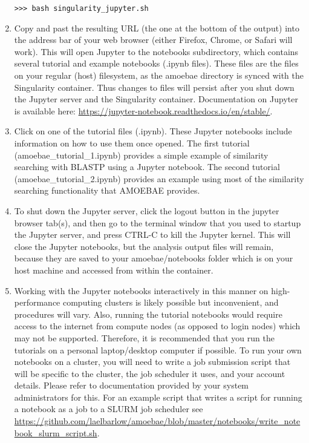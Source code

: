 \documentclass[12pt,letterpaper]{article}
\begin{document}
\begin{linenumbers}
\begin{enumerate}
\begin{lstlisting}
>>> bash singularity_jupyter.sh
\end{lstlisting}


\item Copy and past the resulting URL (the one at the bottom of the output)
    into the address bar of your web browser (either Firefox, Chrome, or Safari
    will work). This will open Jupyter to the notebooks subdirectory, which
        contains several tutorial and example notebooks (.ipynb files). These
        files are the files on your regular (host) filesystem, as the amoebae
        directory is synced with the Singularity container. Thus changes to
        files will persist after you shut down the Jupyter server and the
        Singularity container. Documentation on Jupyter is available here:
    \url{https://jupyter-notebook.readthedocs.io/en/stable/}. 


\item Click on one of the tutorial files (.ipynb). These Jupyter notebooks
    include information on how to use them once opened. The first tutorial
        (amoebae\_tutorial\_1.ipynb) provides a simple example of similarity
        searching with BLASTP using a Jupyter notebook. The second tutorial
        (amoebae\_tutorial\_2.ipynb) provides an example using most of the
        similarity searching functionality that AMOEBAE provides. 

\item To shut down the Jupyter server, click the logout button in the jupyter
    browser tab(s), and then go to the terminal window that you used to startup
    the Jupyter server, and press CTRL-C to kill the Jupyter kernel. This
    will close the Jupyter notebooks, but the analysis output files will
    remain, because they are saved to your amoebae/notebooks folder which is on
    your host machine and accessed from within the container.


\item Working with the Jupyter notebooks interactively in this manner on
    high-performance computing clusters is likely possible but inconvenient,
        and procedures will vary. Also, running the tutorial notebooks would
        require access to the internet from compute nodes (as opposed to login
        nodes) which may not be supported. Therefore, it is recommended that
        you run the tutorials on a personal laptop/desktop computer if
        possible. To run your own notebooks on a cluster, you will need to
        write a job submission script that will be specific to the cluster, the
        job scheduler it uses, and your account details. Please refer to
        documentation provided by your system administrators for this. For an
        example script that writes a script for running a notebook as a job to
        a SLURM job scheduler see
        \url{https://github.com/laelbarlow/amoebae/blob/master/notebooks/write_notebook_slurm_script.sh}.
        


\end{enumerate}
\end{linenumbers}
\end{document}
